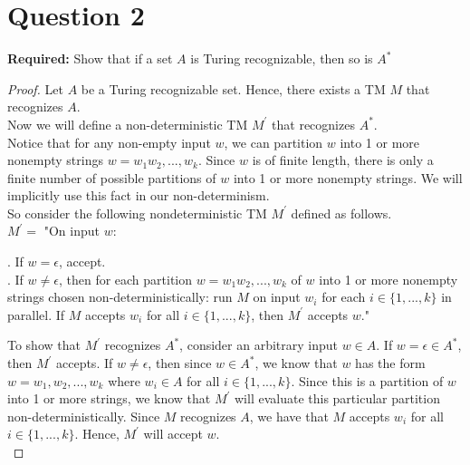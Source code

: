\documentclass[12pt]{article}
\begin{document}
\newpage


\section*{Question 2}

\textbf{Required:} Show that if a set $A$ is Turing recognizable, then so is $A^*$ 

\begin{proof}
Let $A$ be a Turing recognizable set. Hence, there exists a TM $M$ that recognizes $A$. \\

Now we will define a non-deterministic TM $M^\prime$ that recognizes $A^*$. \\

Notice that for any non-empty input $w$, we can partition $w$ into 1 or more nonempty strings $w = w_1w_2,...,w_k$. Since $w$ is of finite length, there is only a finite number of possible partitions of $w$ into 1 or more nonempty strings. We will implicitly use this fact in our non-determinism. \\

So consider the following nondeterministic TM $M^\prime$ defined as follows. \\

$M^\prime = $ "On input $w$: \\

\setlength\parindent{15pt}

. If $w = \epsilon$, accept. \\

. If $w \neq \epsilon$, then for each partition $w = w_1w_2,...,w_k$ of $w$ into 1 or more nonempty strings chosen non-deterministically: run $M$ on input $w_i$ for each $i \in \{1,...,k\}$ in parallel. If $M$ accepts $w_i$ for all $i \in \{1,...,k\}$, then $M^\prime$ accepts $w$." \\

\setlength\parindent{0pt}

To show that $M^\prime$ recognizes $A^*$, consider an arbitrary input $w \in A$. If $w = \epsilon \in A^*$, then $M^\prime$ accepts. If $w \neq \epsilon$, then since $w \in A^*$, we know that $w$ has the form $w = w_1,w_2,...,w_k$ where $w_i \in A$ for all $i \in \{1,...,k\}$. Since this is a partition of $w$ into 1 or more strings, we know that $M^\prime$ will evaluate this particular partition non-deterministically. Since $M$ recognizes $A$, we have that $M$ accepts $w_i$ for all $i \in \{1,...,k\}$. Hence, $M^\prime$ will accept $w$. \\


\end{proof}
\end{document}
